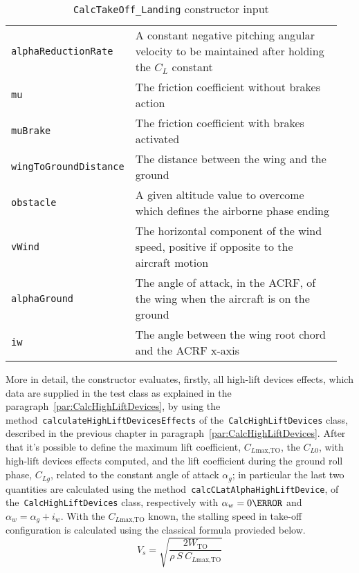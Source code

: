 \begin{table}[!t]
{\begin{tabular}{p{0.25\linewidth}p{0.7\linewidth}}
\lstinline[language=Java]!alphaReductionRate! & A constant negative pitching angular velocity to be maintained after holding the $C_L$ constant \\ [0.2cm]
\lstinline[language=Java]!mu! & The friction coefficient without brakes action \\ [0.2cm]
\lstinline[language=Java]!muBrake! & The friction coefficient with brakes activated \\ [0.2cm]
\lstinline[language=Java]!wingToGroundDistance! & The distance between the wing and the ground  \\ [0.2cm]
\lstinline[language=Java]!obstacle! & A given altitude value to overcome which defines the airborne phase ending \\ [0.2cm]
\lstinline[language=Java]!vWind! & The horizontal component of the wind speed, positive if opposite to the aircraft motion \\ [0.2cm]
\lstinline[language=Java]!alphaGround! & The angle of attack, in the \gls{ACRF}, of the wing when the aircraft is on the ground \\ [0.2cm]
\lstinline[language=Java]!iw! & The angle between the wing root chord and the \gls{ACRF} x-axis \\ 
\bottomrule
\end{tabular}
}
\caption{\lstinline[language=Java]!CalcTakeOff_Landing! constructor input}
\label{table:CalcTakeOffInput}
\end{table}
%
More in detail, the constructor evaluates, firstly, all high-lift devices effects, which data are supplied in the test class as explained in the paragraph~\ref{par:CalcHighLiftDevices}, by using the method~\lstinline[language=Java]!calculateHighLiftDevicesEffects! of the~\lstinline[language=Java]!CalcHighLiftDevices! class, described in the previous chapter in paragraph~\ref{par:CalcHighLiftDevices}. After that it's possible to define the maximum lift coefficient, $C_{L\text{max,TO}}$, the $C_{L0}$, with high-lift devices effects computed, and the lift coefficient during the ground roll phase, $C_{Lg}$, related to the constant angle of attack $\alpha_g$; in particular the last two quantities are calculated using the method~\lstinline[language=Java]!calcCLatAlphaHighLiftDevice!, of the~\lstinline[language=Java]!CalcHighLiftDevices! class, respectively with $\alpha_w=0\degree$ and  $\alpha_w=\alpha_g+i_w$.
%
With the $C_{L\text{max,TO}}$ known, the stalling speed in take-off configuration is calculated using the classical formula provieded below.
%
\begin{equation}
V_s=\sqrt{\dfrac{2W_{\text{TO}}}{\rho\ S\ C_{L\text{max,TO}}}}
\label{eqn:Lift.Equation}
\end{equation} 
